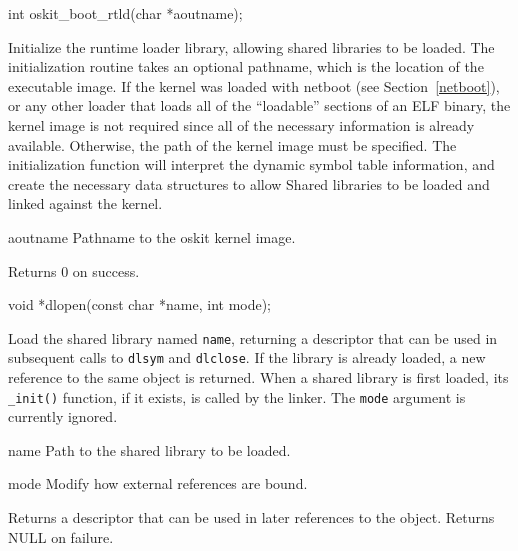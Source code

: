 \begin{apisyn}

	\funcproto int oskit_boot_rtld(char *aoutname);
\end{apisyn}
\begin{apidesc}
	Initialize the runtime loader library, allowing shared libraries to
	be loaded. The initialization routine takes an optional pathname,
	which is the location of the \oskit{} executable image. If the
	kernel was loaded with netboot (see Section~\ref{netboot}), or any
	other loader that loads all of the ``loadable'' sections of an ELF
	binary, the kernel image is not required since all of the necessary
	information is already available. Otherwise, the path of the
	\oskit{} kernel image must be specified. The initialization
	function will interpret the dynamic symbol table information, and
	create the necessary data structures to allow Shared libraries to
	be loaded and linked against the \oskit{} kernel.
\end{apidesc}
\begin{apiparm}
	\item[aoutname]
		Pathname to the oskit kernel image.
\end{apiparm}
\begin{apiret}
	Returns 0 on success.
\end{apiret}


\begin{apisyn}

	\funcproto void *dlopen(const char *name, int mode);
\end{apisyn}
\begin{apidesc}
	Load the shared library named \texttt{name}, returning a descriptor
	that can be used in subsequent calls to \texttt{dlsym} and
	\texttt{dlclose}. If the library is already loaded, a new reference
	to the same object is returned. When a shared library is first
	loaded, its \texttt{_init()} function, if it exists, is called by
	the linker. The \texttt{mode} argument is currently ignored.
\end{apidesc}
\begin{apiparm}
	\item[name]
		Path to the shared library to be loaded.
	\item[mode]
		Modify how external references are bound.
\end{apiparm}
\begin{apiret}
	Returns a descriptor that can be used in later references to the
	object. Returns NULL on failure. 
\end{apiret}


